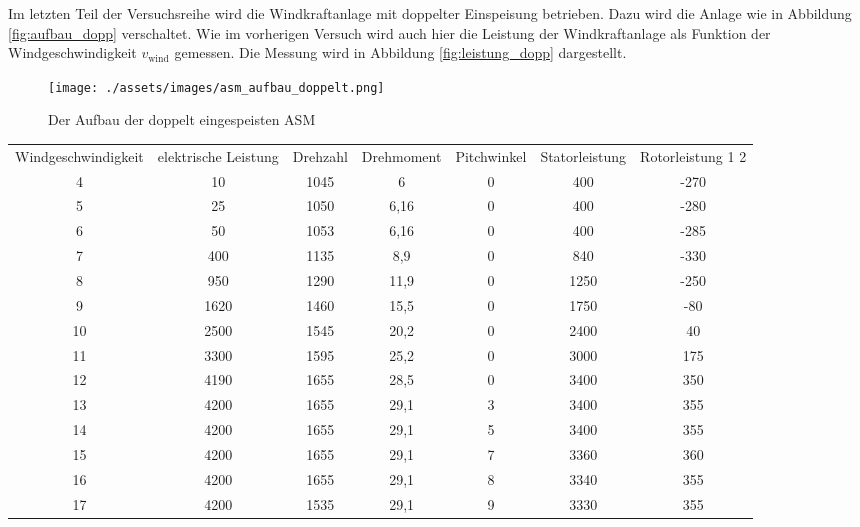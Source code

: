 \documentclass{report}
\begin{document}
Im letzten Teil der Versuchsreihe wird die Windkraftanlage mit doppelter Einspeisung betrieben. Dazu wird die Anlage wie in Abbildung \ref{fig:aufbau_dopp} verschaltet. Wie im vorherigen Versuch wird auch hier die Leistung der Windkraftanlage als Funktion der Windgeschwindigkeit $v_{\mathrm{wind}}$ gemessen. Die Messung wird in Abbildung \ref{fig:leistung_dopp} dargestellt.

\begin{figure}[!ht]
  \centering
  \texttt{[image: ./assets/images/asm\_aufbau\_doppelt.png]}
  \caption{Der Aufbau der doppelt eingespeisten ASM}
  \label{fig:asm_aufbau_doppelt}
\end{figure}


\begin{table}[!ht]
\begin{tabular}{|c|c|c|c|c|c|c|}
Windgeschwindigkeit & elektrische Leistung & Drehzahl & Drehmoment & Pitchwinkel & Statorleistung & Rotorleistung   1   2 \\

4                   & 10                   & 1045     & 6          & 0           & 400            & -270          \\
5                   & 25                   & 1050     & 6,16       & 0           & 400            & -280          \\
6                   & 50                   & 1053     & 6,16       & 0           & 400            & -285          \\
7                   & 400                  & 1135     & 8,9        & 0           & 840            & -330          \\
8                   & 950                  & 1290     & 11,9       & 0           & 1250           & -250          \\
9                   & 1620                 & 1460     & 15,5       & 0           & 1750           & -80           \\
10                  & 2500                 & 1545     & 20,2       & 0           & 2400           & 40            \\
11                  & 3300                 & 1595     & 25,2       & 0           & 3000           & 175           \\
12                  & 4190                 & 1655     & 28,5       & 0           & 3400           & 350           \\
13                  & 4200                 & 1655     & 29,1       & 3           & 3400           & 355           \\
14                  & 4200                 & 1655     & 29,1       & 5           & 3400           & 355           \\
15                  & 4200                 & 1655     & 29,1       & 7           & 3360           & 360           \\
16                  & 4200                 & 1655     & 29,1       & 8           & 3340           & 355           \\
17                  & 4200                 & 1535     & 29,1       & 9           & 3330           & 355
\end{tabular}
\end{table}
\end{document}
